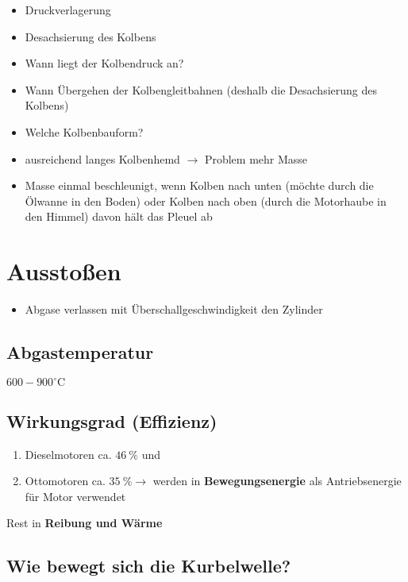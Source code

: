 \begin{itemize}
\item
  Druckverlagerung
\item
  Desachsierung des Kolbens
\item
  Wann liegt der Kolbendruck an?
\item
  Wann Übergehen der Kolbengleitbahnen (deshalb die Desachsierung des
  Kolbens)
\item
  Welche Kolbenbauform?
\item
  ausreichend langes Kolbenhemd $\to$ Problem mehr Masse
\item
  Masse einmal beschleunigt, wenn Kolben nach unten (möchte durch die
  Ölwanne in den Boden) oder Kolben nach oben (durch die Motorhaube in
  den Himmel) davon hält das Pleuel ab
\end{itemize}

\section{Ausstoßen}\label{ausstossen}

\begin{itemize}
\item
  Abgase verlassen mit Überschallgeschwindigkeit den Zylinder
\end{itemize}

\subsection{Abgastemperatur}\label{abgastemperatur}

$600 - 900^\circ\text{C}$

\subsection{Wirkungsgrad (Effizienz)}\label{wirkungsgrad-effizienz}

\begin{enumerate}
\item
  Dieselmotoren ca. $46~\%$ und
\item
  Ottomotoren ca. $35~\% \to$ werden in \textbf{Bewegungsenergie} als
  Antriebsenergie für Motor verwendet
\end{enumerate}

Rest in \textbf{Reibung und Wärme}

\subsection{Wie bewegt sich die
Kurbelwelle?}\label{wie-bewegt-sich-die-kurbelwelle}

